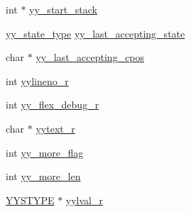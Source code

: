 \begin{DoxyCompactItemize}
\item 
int $\ast$ \hyperlink{structyyguts__t_af6e2e45a5fdba0f313c680b35da4292a}{yy\-\_\-start\-\_\-stack}
\item 
\hyperlink{scanner_8c_a9ba7c416f135b0f0c1f4addded4616b5}{yy\-\_\-state\-\_\-type} \hyperlink{structyyguts__t_a84e01a3658729e9d69f79feb3faf1c99}{yy\-\_\-last\-\_\-accepting\-\_\-state}
\item 
char $\ast$ \hyperlink{structyyguts__t_a46fb8d232ed375921af0b37caeeb67c4}{yy\-\_\-last\-\_\-accepting\-\_\-cpos}
\item 
int \hyperlink{structyyguts__t_aa9f13776b8d311e847cc7d974d49af4c}{yylineno\-\_\-r}
\item 
int \hyperlink{structyyguts__t_a5ad72d75ed6d693824fe7e02ce21118e}{yy\-\_\-flex\-\_\-debug\-\_\-r}
\item 
char $\ast$ \hyperlink{structyyguts__t_aebaa731ad6cbe2411d104925e5bb3f2c}{yytext\-\_\-r}
\item 
int \hyperlink{structyyguts__t_a664a72171cc3e720fcb8120af9b72883}{yy\-\_\-more\-\_\-flag}
\item 
int \hyperlink{structyyguts__t_a683563bf4cd73f25b4c7b78579c1330e}{yy\-\_\-more\-\_\-len}
\item 
\hyperlink{unionYYSTYPE}{Y\-Y\-S\-T\-Y\-P\-E} $\ast$ \hyperlink{structyyguts__t_a55dbdcd46a36d34adcbfc29be44d10cf}{yylval\-\_\-r}
\end{DoxyCompactItemize}


